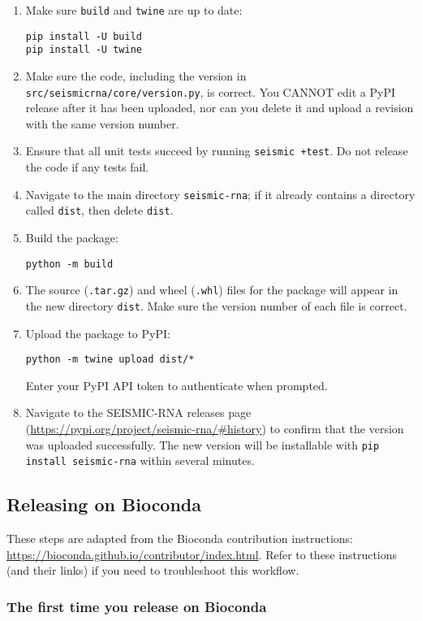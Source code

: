 \documentclass[main.tex]{subfiles}
\begin{document}
\begin{enumerate}
    \item Make sure \verb|build| and \verb|twine| are up to date:
        \begin{verbatim}
pip install -U build
pip install -U twine
        \end{verbatim}
    \item Make sure the code, including the version in \verb|src/seismicrna/core/version.py|, is correct. You CANNOT edit a PyPI release after it has been uploaded, nor can you delete it and upload a revision with the same version number.
    \item Ensure that all unit tests succeed by running \verb|seismic +test|. Do not release the code if any tests fail.
    \item Navigate to the main directory \verb|seismic-rna|; if it already contains a directory called \verb|dist|, then delete \verb|dist|.
    \item Build the package:
        \begin{verbatim}
python -m build
        \end{verbatim}
    \item The source (\verb|.tar.gz|) and wheel (\verb|.whl|) files for the package will appear in the new directory \verb|dist|. Make sure the version number of each file is correct.
    \item Upload the package to PyPI:
        \begin{verbatim}
python -m twine upload dist/*
        \end{verbatim}
        Enter your PyPI API token to authenticate when prompted.
    \item Navigate to the SEISMIC-RNA releases page (\url{https://pypi.org/project/seismic-rna/#history}) to confirm that the version was uploaded successfully. The new version will be installable with \verb|pip install seismic-rna| within several minutes.
\end{enumerate}


\subsection{Releasing on Bioconda}

These steps are adapted from the Bioconda contribution instructions: \url{https://bioconda.github.io/contributor/index.html}.
Refer to these instructions (and their links) if you need to troubleshoot this workflow.

\subsubsection{The first time you release on Bioconda}
\end{document}
